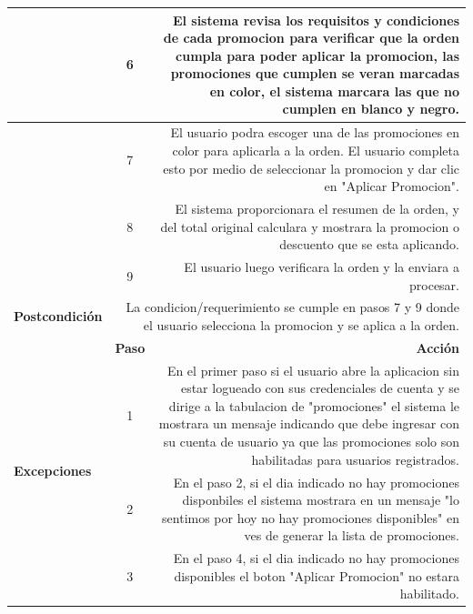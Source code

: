 \documentclass[conference]{IEEEtran}
\begin{document}
\begin{table}[H]
\begin{adjustbox}{width=0.42\textwidth}
\begin{tabular}{|p{11.215em}|r|r|}
    \midrule
    \multicolumn{1}{|r|}{} & \multicolumn{1}{c|}{6} & \multicolumn{1}{p{32em}|}{El sistema revisa los requisitos y condiciones de cada promocion para verificar que la orden cumpla para poder aplicar la promocion, las promociones que cumplen se veran marcadas en color, el sistema marcara las que no cumplen en blanco y negro.} \\
    \midrule
    \multicolumn{1}{|r|}{} & \multicolumn{1}{c|}{7} & \multicolumn{1}{p{32em}|}{El usuario podra escoger una de las promociones en color para aplicarla a la orden. El usuario completa esto por medio de seleccionar la promocion y dar clic en "Aplicar Promocion".} \\
    \midrule
    \multicolumn{1}{|r|}{} & \multicolumn{1}{c|}{8} & \multicolumn{1}{p{32em}|}{El sistema proporcionara el resumen de la orden, y del total original calculara y mostrara la promocion o descuento que se esta aplicando.} \\
    \midrule
    \multicolumn{1}{|r|}{} & \multicolumn{1}{c|}{9} & \multicolumn{1}{p{32em}|}{El usuario luego verificara la orden y la enviara a procesar.} \\
    \midrule
    \textbf{Postcondición} & \multicolumn{2}{p{37.43em}|}{La condicion/requerimiento se cumple en pasos 7 y 9 donde el usuario selecciona la promocion y se aplica a la orden.} \\
    \midrule
    \multirow{5}[10]{*}{\textbf{Excepciones}} & \multicolumn{1}{p{5.43em}|}{\textbf{Paso}} & \multicolumn{1}{p{32em}|}{\textbf{Acción}} \\
\cmidrule{2-3}    \multicolumn{1}{|c|}{} & \multicolumn{1}{c|}{1} & \multicolumn{1}{p{32em}|}{En el primer paso si el usuario abre la aplicacion sin estar logueado con sus credenciales de cuenta y se dirige a la tabulacion de "promociones" el sistema le mostrara un mensaje indicando que debe ingresar con su cuenta de usuario ya que las promociones solo son habilitadas para usuarios registrados.} \\
\cmidrule{2-3}    \multicolumn{1}{|c|}{} & \multicolumn{1}{c|}{2} & \multicolumn{1}{p{32em}|}{En el paso 2, si el dia indicado no hay promociones disponbiles el sistema mostrara en un mensaje "lo sentimos por hoy no hay promociones disponibles" en ves de generar la lista de promociones.} \\
\cmidrule{2-3}    \multicolumn{1}{|c|}{} & \multicolumn{1}{c|}{3} & \multicolumn{1}{p{32em}|}{En el paso 4, si el dia indicado no hay promociones disponibles el boton "Aplicar Promocion" no estara habilitado.} \\

\end{tabular}
\end{adjustbox}
\end{table}
\end{document}

